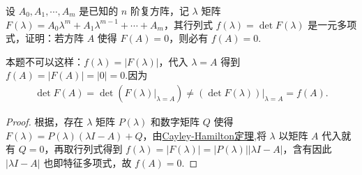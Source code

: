 \documentclass[../../main.tex]{subfiles}%
\begin{document}
\begin{example}
设 $A_0,A_1,\cdots,A_m$ 是已知的 $n$ 阶复方阵，记 $\lambda$ 矩阵 $F(\lambda)=A_0\lambda^m + A_1\lambda^{m - 1} + \cdots + A_m$，其行列式 $f(\lambda)=\det F(\lambda)$ 是一元多项式，证明：若方阵 $A$ 使得 $F(A)=0$，则必有 $f(A)=0$.
\end{example}
\begin{remark}
本题不可以这样：$f(\lambda)=|F(\lambda)|$，代入 $\lambda = A$ 得到 $f(A)=|F(A)|=|0|=0$.因为
\begin{align*}
\det F\left( A \right) =\det \left( F\left( \lambda \right) |_{\lambda =A} \right) \ne \left( \det F\left( \lambda \right) \right) |_{\lambda =A}=f\left( A \right) .
\end{align*}
\end{remark}
\begin{proof}
根据，存在 $\lambda$ 矩阵 $P(\lambda)$ 和数字矩阵 $Q$ 使得 $F(\lambda)=P(\lambda)(\lambda I - A)+Q$，由\hyperref[theorem:Cayley-Hamilton定理]{Cayley-Hamilton定理},将 $\lambda$ 以矩阵 $A$ 代入就有 $Q = 0$，再取行列式得到 $f(\lambda)=|F(\lambda)|=|P(\lambda)||\lambda I - A|$，含有因此 $|\lambda I - A|$ 也即特征多项式，故 $f(A)=0.$
\end{proof}
\end{document}
